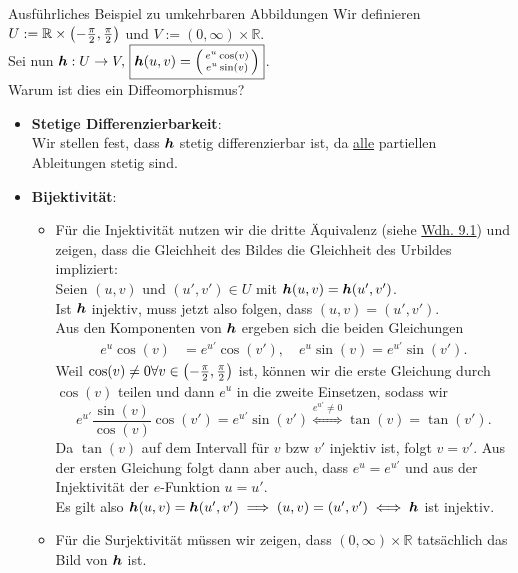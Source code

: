 \begin{Beispiel}
{Ausführliches Beispiel zu umkehrbaren Abbildungen}
Wir definieren $U:=\mathbb{R}\times\left({-\frac{\pi}{2},\frac{\pi}{2}}\right)$ und $V:=(0,\infty)\times \mathbb{R}$.\\
Sei nun ${{\text{\boldmath${h}$}}}:U\to V,\,\boxed{{{\text{\boldmath${h}$}}}(u,v)=\left(\begin{smallmatrix}e^u\cos(v)\\e^u\sin(v)\end{smallmatrix}\right)}$.\\
Warum ist dies ein Diffeomorphismus?
\begin{itemize}
    \item \textbf{Stetige Differenzierbarkeit}:\\
    Wir stellen fest, dass ${{\text{\boldmath${h}$}}}$ stetig differenzierbar ist, da \underline{alle} partiellen Ableitungen stetig sind.
    \item \textbf{Bijektivität}:
    \begin{itemize}
        \item Für die Injektivität nutzen wir die dritte Äquivalenz (siehe \hyperref[wdh:09InjekSurjek]{Wdh. 9.1}) und zeigen, dass die Gleichheit des Bildes die Gleichheit des Urbildes impliziert:\\
        Seien $(u,v)$ und $(u',v')\in U$ mit ${{\text{\boldmath${h}$}}}(u,v)={{\text{\boldmath${h}$}}}(u',v')$.\\
        Ist ${{\text{\boldmath${h}$}}}$ injektiv, muss jetzt also folgen, dass $(u,v)=(u',v')$.\\
        Aus den Komponenten von ${{\text{\boldmath${h}$}}}$ ergeben sich die beiden Gleichungen
        \begin{align*}
            e^u\cos(v)&=e^{u'}\cos(v'),\quad e^u\sin(v)=e^{u'}\sin(v').
        \end{align*}
        Weil $\cos(v)\neq0\forall v\in\left({-\frac{\pi}{2},\frac{\pi}{2}}\right)$ ist, können wir die erste Gleichung durch $\cos(v)$ teilen und dann $e^u$ in die zweite Einsetzen, sodass wir
        \begin{equation*}
            e^{u'}\frac{\sin(v)}{\cos(v)}\cos(v')=e^{u'}\sin(v')\overset{e^{u'}\neq0}{\iff}\tan(v)=\tan(v').
        \end{equation*}
        Da $\tan(v)$ auf dem Intervall für $v$ bzw $v'$ injektiv ist, folgt $v=v'$. Aus der ersten Gleichung folgt dann aber auch, dass $e^{u}=e^{u'}$ und aus der Injektivität der $e$-Funktion $u=u'$.\\
        Es gilt also ${{\text{\boldmath${h}$}}}(u,v)={{\text{\boldmath${h}$}}}(u',v')\implies(u,v)=(u',v')\iff{{\text{\boldmath${h}$}}}$ ist injektiv.
        \item Für die Surjektivität müssen wir zeigen, dass $(0,\infty)\times\mathbb{R}$ tatsächlich das Bild von ${{\text{\boldmath${h}$}}}$ ist.\\

\end{itemize}
\end{itemize}
\end{Beispiel}
